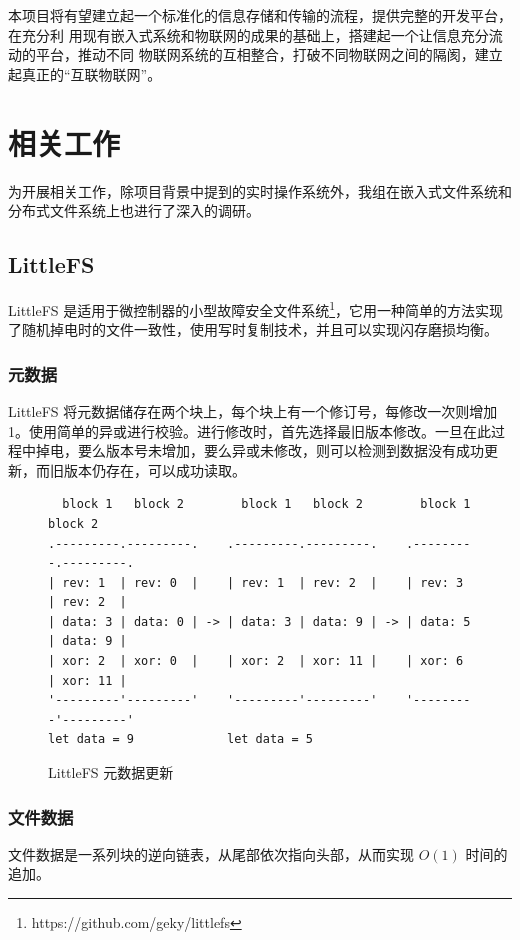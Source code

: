 \documentclass{ctexart}
\begin{document}
本项目将有望建立起一个标准化的信息存储和传输的流程，提供完整的开发平台，在充分利
用现有嵌入式系统和物联网的成果的基础上，搭建起一个让信息充分流动的平台，推动不同
物联网系统的互相整合，打破不同物联网之间的隔阂，建立起真正的“互联物联网”。

\section{相关工作}

为开展相关工作，除项目背景中提到的实时操作系统外，我组在嵌入式文件系统和分布式文件系统上也进行了深入的调研。

\subsection{LittleFS}

LittleFS 是适用于微控制器的小型故障安全文件系统\footnote{https://github.com/geky/littlefs}，它用一种简单的方法实现了随机掉电时的文件一致性，使用写时复制技术，并且可以实现闪存磨损均衡。

\subsubsection{元数据}

LittleFS 将元数据储存在两个块上，每个块上有一个修订号，每修改一次则增加 1。使用简单的异或进行校验。进行修改时，首先选择最旧版本修改。一旦在此过程中掉电，要么版本号未增加，要么异或未修改，则可以检测到数据没有成功更新，而旧版本仍存在，可以成功读取。

\begin{figure}
\begin{verbatim}
  block 1   block 2        block 1   block 2        block 1   block 2
.---------.---------.    .---------.---------.    .---------.---------.
| rev: 1  | rev: 0  |    | rev: 1  | rev: 2  |    | rev: 3  | rev: 2  |
| data: 3 | data: 0 | -> | data: 3 | data: 9 | -> | data: 5 | data: 9 |
| xor: 2  | xor: 0  |    | xor: 2  | xor: 11 |    | xor: 6  | xor: 11 |
'---------'---------'    '---------'---------'    '---------'---------'
let data = 9             let data = 5
\end{verbatim}
\caption{LittleFS 元数据更新}
\end{figure}

\subsubsection{文件数据}

文件数据是一系列块的逆向链表，从尾部依次指向头部，从而实现 $O(1)$ 时间的追加。
\end{document}
